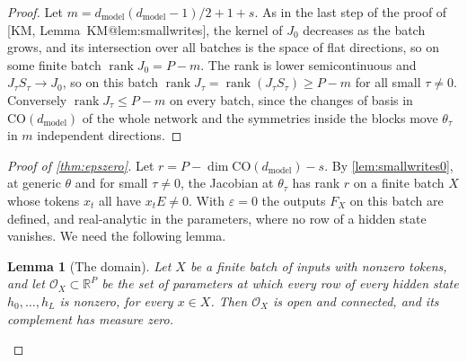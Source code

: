 \documentclass[10pt]{article}
\makeatletter
\newtheorem{lemma}[theorem]{Lemma}
\theoremstyle{definition}
\theoremstyle{remark}
\newcommand{\R}{\mathbb{R}}
\newcommand{\dm}{d_{\mathrm{model}}}
\newcommand{\CO}{\mathrm{CO}}
\newenvironment{nested}{\par\nopagebreak\def\FrameCommand{\hspace{0.5em}{\color{black!30}\vrule width 0.6pt}\hspace{1em}}\MakeFramed{\advance\hsize-\width\FrameRestore}}{\endMakeFramed}
\newcommand{\KMn}[1]{\csname KM@#1\endcsname}
\newcommand{\KM}[2]{[KM, #1~\KMn{#2}]}
\makeatother
\begin{document}
\begin{proof}
Let $m = \dm(\dm-1)/2 + 1 + s$. As in the last step of the proof of \KM{Lemma}{lem:smallwrites}, the kernel of $J_0$ decreases as the batch grows, and its intersection over all batches is the space of flat directions, so on some finite batch $\operatorname{rank}J_0 = P - m$. The rank is lower semicontinuous and $J_\tau S_\tau \to J_0$, so on this batch $\operatorname{rank}J_\tau = \operatorname{rank}(J_\tau S_\tau) \ge P - m$ for all small $\tau \neq 0$. Conversely $\operatorname{rank}J_\tau \le P - m$ on every batch, since the changes of basis in $\CO(\dm)$ of the whole network and the symmetries inside the blocks move $\theta_\tau$ in $m$ independent directions.
\end{proof}

\begin{proof}[Proof of \cref{thm:epszero}]
Let $r = P - \dim\CO(\dm) - s$. By \cref{lem:smallwrites0}, at generic $\theta$ and for small $\tau \neq 0$, the Jacobian at $\theta_\tau$ has rank $r$ on a finite batch $X$ whose tokens $x_t$ all have $x_tE \neq 0$. With $\varepsilon = 0$ the outputs $F_X$ on this batch are defined, and real-analytic in the parameters, where no row of a hidden state vanishes. We need the following lemma.
\begin{nested}
\begin{lemma}[The domain]\label{lem:domain}
Let $X$ be a finite batch of inputs with nonzero tokens, and let $\mathcal O_X \subset \R^P$ be the set of parameters at which every row of every hidden state $h_0, \dots, h_L$ is nonzero, for every $x \in X$. Then $\mathcal O_X$ is open and connected, and its complement has measure zero.
\end{lemma}


\end{nested}
\end{proof}
\end{document}
